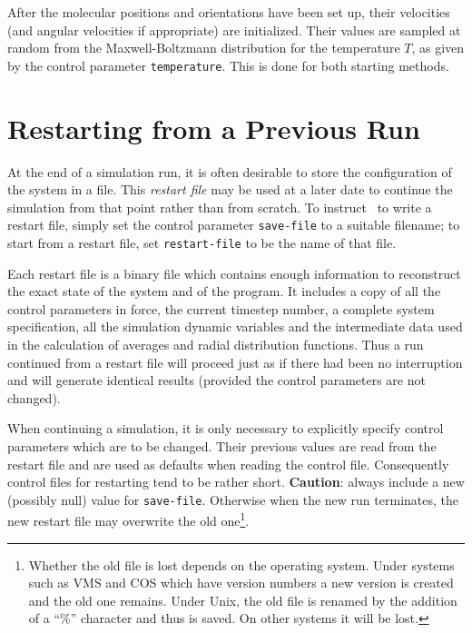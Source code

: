 After the molecular positions and orientations have been set up, their
velocities (and angular velocities if appropriate) are initialized.
Their values are sampled at random from the
Maxwell-Boltzmann distribution for the temperature $T$, as given by
the control parameter \verb'temperature'.  This is done for both
starting methods.

\section{Restarting from a Previous Run}%
\label{sec:restarting}

At the end of a simulation run, it is often desirable to store the
configuration of the system in a file.  This {\em restart file\/} may be
used at a later date to continue the simulation from that point rather
than from scratch.  To instruct \moldy\  to write a restart file, simply
set the control parameter \verb'save-file' to a suitable filename; to
start from a restart file, set \verb'restart-file' to be the name of
that file.

Each restart file is a binary file which contains enough information
to reconstruct the exact state of the system and of the program.  It
includes a copy of all the control parameters in force, the current
timestep number, a complete system specification, all the simulation
dynamic variables and the intermediate data used in the calculation of
averages and radial distribution functions.  Thus a run continued from
a restart file will proceed just as if there had been no interruption
and will generate identical results (provided the control parameters
are not changed).

When continuing a simulation, it is only necessary to explicitly
specify control parameters which are to be changed.  Their previous
values are read from the restart file and are used as defaults when
reading the control file. Consequently control files for restarting
tend to be rather short. {\bf Caution}: always include a new (possibly
null) value for \verb'save-file'. Otherwise when the new run
terminates, the new restart file may overwrite the old
one\footnote{Whether the old file is lost depends on the operating
system. Under systems such as VMS and COS which have version numbers a
new version is created and the old one remains. Under Unix, the old
file is renamed by the addition of a ``\%'' character and thus is
saved. On other systems it will be lost.}.

